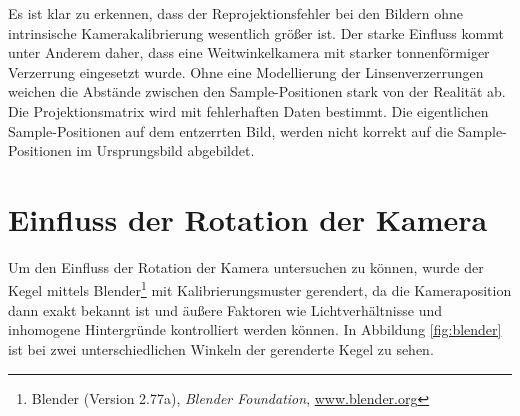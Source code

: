 Es ist klar zu erkennen, dass der Reprojektionsfehler bei den Bildern ohne intrinsische Kamerakalibrierung wesentlich größer ist. Der starke Einfluss kommt unter Anderem daher, dass eine Weitwinkelkamera mit starker tonnenförmiger Verzerrung eingesetzt wurde. Ohne eine Modellierung der Linsenverzerrungen weichen die Abstände zwischen den Sample-Positionen stark von der Realität ab. Die Projektionsmatrix wird mit fehlerhaften Daten bestimmt. Die eigentlichen Sample-Positionen auf dem entzerrten Bild, werden nicht korrekt auf die Sample-Positionen im Ursprungsbild abgebildet.

\section{Einfluss der Rotation der Kamera}
Um den Einfluss der Rotation der Kamera untersuchen zu können, wurde der Kegel mittels Blender\footnote{Blender (Version 2.77a), \textit{Blender Foundation}, \url{www.blender.org}} mit Kalibrierungsmuster gerendert, da die Kameraposition dann exakt bekannt ist und äußere Faktoren wie Lichtverhältnisse und inhomogene Hintergründe kontrolliert werden können. In Abbildung \ref{fig:blender} ist bei zwei unterschiedlichen Winkeln der gerenderte Kegel zu sehen.

